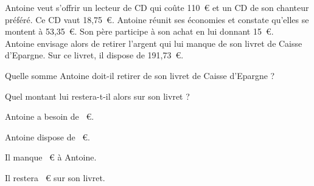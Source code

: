 Antoine veut s'offrir un lecteur de CD qui coûte 110~\textgreek{\euro}
et un CD de son chanteur préféré. Ce CD vaut
18,75~\textgreek{\euro}. Antoine réunit ses économies et constate
qu'elles se montent à 53,35~\textgreek{\euro}. Son père participe à son
achat en lui donnant 15~\textgreek{\euro}.
\\Antoine envisage alors de retirer l'argent qui lui manque de son
livret de Caisse d'Epargne. Sur ce livret, il dispose de
191,73~\textgreek{\euro}.
\begin{myenumerate}
\item Quelle somme Antoine doit-il retirer de son livret de Caisse
  d'Epargne ?
\item Quel montant lui restera-t-il alors sur son livret ?
\end{myenumerate}
\begin{myenumerate}
  \item\subitem{}\par
\begin{multicols}{3}
\par Antoine a besoin de ~\textgreek{\euro}.
\par
{}
\par Antoine dispose de ~\textgreek{\euro}.
\par
{}
\par Il manque ~\textgreek{\euro} à Antoine.
\end{multicols}
\item\subitem{}\par
{}\kern2cm Il restera ~\textgreek{\euro} sur son livret.
\end{myenumerate}
